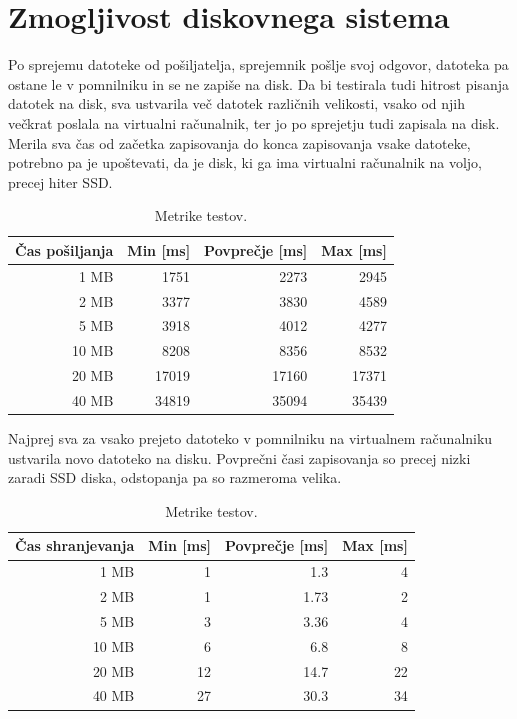 \section{Zmogljivost diskovnega sistema}

Po sprejemu datoteke od pošiljatelja, sprejemnik pošlje svoj odgovor, datoteka pa ostane le v pomnilniku in se ne zapiše na disk. Da bi testirala tudi hitrost pisanja datotek na disk, sva ustvarila več datotek različnih velikosti, vsako od njih večkrat poslala na virtualni računalnik, ter jo po sprejetju tudi zapisala na disk. Merila sva čas od začetka zapisovanja do konca zapisovanja vsake datoteke, potrebno pa je upoštevati, da je disk, ki ga ima virtualni računalnik na voljo, precej hiter SSD.

\begin{table}[H]
	\centering
	\begin{tabular}{ | r | r | r | r | }
		\hline
		Čas pošiljanja & Min [ms] & Povprečje [ms] & Max [ms]  \\
		\hline
		1 MB & 1751 & 2273 & 2945 \\
		2 MB & 3377 & 3830 & 4589 \\
		5 MB & 3918 & 4012 & 4277 \\
		10 MB & 8208 & 8356 & 8532 \\
		20 MB & 17019 & 17160 & 17371 \\
		40 MB & 34819 & 35094 & 35439 \\
		\hline
	\end{tabular}
	\caption{Metrike  testov.}
	\label{table:1_chunks}
\end{table}

Najprej sva za vsako prejeto datoteko v pomnilniku na virtualnem računalniku ustvarila novo datoteko na disku. Povprečni časi zapisovanja so precej nizki zaradi SSD diska, odstopanja pa so razmeroma velika.

\begin{table}[H]
	\centering
	\begin{tabular}{ | r | r | r | r | }
		\hline
		Čas shranjevanja & Min [ms] & Povprečje [ms] & Max [ms]  \\
		\hline
		1 MB & 1 & 1.3 & 4 \\
		2 MB & 1 & 1.73 & 2 \\
		5 MB & 3 & 3.36 & 4 \\
		10 MB & 6 & 6.8 & 8 \\
		20 MB & 12 & 14.7 & 22 \\
		40 MB & 27 & 30.3 & 34 \\
		\hline
	\end{tabular}
	\caption{Metrike  testov.}
	\label{table:1_chunks}
\end{table}

